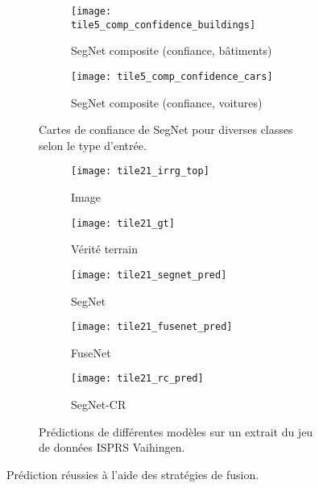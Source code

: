 \begin{figure}[!tb]
\begin{subfigure}{\textwidth}
\begin{subfigure}{0.19\textwidth}
        \end{subfigure}
        \begin{subfigure}{0.19\textwidth}
        	\texttt{[image: tile5\_comp\_confidence\_buildings]}
        	\caption*{SegNet composite (confiance, bâtiments)}
        \end{subfigure}
        \begin{subfigure}{0.19\textwidth}
        	\texttt{[image: tile5\_comp\_confidence\_cars]}
        	\caption*{SegNet composite (confiance, voitures)}
        \end{subfigure}
        \caption{Cartes de confiance de SegNet pour diverses classes selon le type d'entrée.}
        \label{fig:confidence_vaihingen_fusion}
    \end{subfigure}
    \begin{subfigure}{\textwidth}
    	\captionsetup[subfigure]{singlelinecheck=off,justification=centering}
  		\captionsetup[subfigure]{labelformat=empty}
    	\begin{subfigure}{0.19\textwidth}
        	\texttt{[image: tile21\_irrg\_top]}
      		\caption*{Image }
        \end{subfigure}
        \begin{subfigure}{0.19\textwidth}
        	\texttt{[image: tile21\_gt]}
        	\caption*{Vérité terrain}
        \end{subfigure}
        \begin{subfigure}{0.19\textwidth}
        	\texttt{[image: tile21\_segnet\_pred]}
        	\caption*{SegNet}
        \end{subfigure}
        \begin{subfigure}{0.19\textwidth}
        	\texttt{[image: tile21\_fusenet\_pred]}
        	\caption*{FuseNet}
        \end{subfigure}
        \begin{subfigure}{0.19\textwidth}
        	\texttt{[image: tile21\_rc\_pred]}
        	\caption*{SegNet-CR}
        \end{subfigure}
        \caption{Prédictions de différentes modèles sur un extrait du jeu de données \gls{ISPRS} Vaihingen.}
        \label{fig:fusion_exemple2}
    \end{subfigure}

	\caption{Prédiction réussies à l'aide des stratégies de fusion.\\
  \isprslegende}
   	\label{fig:fusion_success}
\end{figure}

